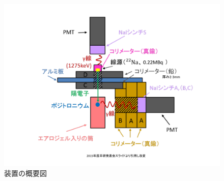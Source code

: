 \begin{figure}[H]
	\begin{center}
		\includegraphics[width=15cm]{fig/isb/settings.pdf}
		\caption{装置の概要図}
		\label{fig:setting_dtl2015}
	\end{center}
\end{figure}

